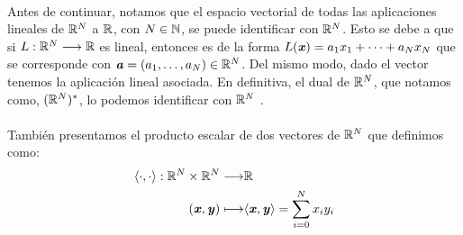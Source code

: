 	
	\paragraph{}Antes de continuar, notamos que el espacio vectorial de todas las aplicaciones lineales de $ \mathbb{R}^N $ a $ \mathbb{R} $, con $ N \in \mathbb{N} $, se puede identificar con $ \mathbb{R}^N $. Esto se debe a que si $ L:\mathbb{R}^N \longrightarrow \mathbb{R} $ es lineal, entonces es de la forma $ L(\textbf{\emph{x}}) = a_1x_1 + \cdots + a_Nx_N $ que se corresponde con $ \textbf{\emph{a}} = (a_1,\dots,a_N) \in \mathbb{R}^N $. Del mismo modo, dado el vector tenemos la aplicación lineal asociada. En definitiva, el dual de 
	$ \mathbb{R}^N $, que notamos como, $ (\mathbb{R}^N)^* $, lo podemos identificar con $ \mathbb{R}^N $ .
	\paragraph{} También presentamos el producto escalar de dos vectores de $ \mathbb{R}^N $ que definimos como:
	\[
	\begin{split}
	\langle \cdot, \cdot \rangle : \mathbb{R}^N \times \mathbb{R}^N \longrightarrow &\mathbb{R} \\
	(\textbf{\emph{x}}, \textbf{\emph{y}}) \longmapsto &\langle \textbf{\emph{x}}, \textbf{\emph{y}} \rangle = \sum_{i=0}^{N}x_iy_i
	\end{split}
	\]
